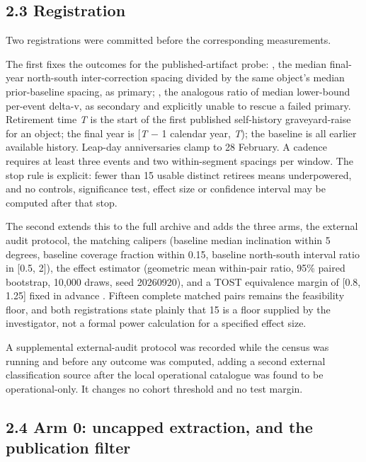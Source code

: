 \documentclass[11pt]{article}
\begin{document}
\subsection*{2.3 Registration}

Two registrations were committed before the corresponding measurements.

The first
fixes the outcomes for the published-artifact probe: , the median final-year north-south inter-correction spacing divided by the same object's median prior-baseline spacing, as primary; , the analogous ratio of median lower-bound per-event delta-v, as secondary and explicitly unable to rescue a failed primary. Retirement time \emph{T} is the start of the first published self-history graveyard-raise for an object; the final year is [\emph{T} $-$ 1 calendar year, \emph{T}); the baseline is all earlier available history. Leap-day anniversaries clamp to 28 February. A cadence requires at least three events and two within-segment spacings per window. The stop rule is explicit: fewer than 15 usable distinct retirees means underpowered, and no controls, significance test, effect size or confidence interval may be computed after that stop.

The second
extends this to the full archive and adds the three arms, the external audit protocol, the matching calipers (baseline median inclination within 5 degrees, baseline coverage fraction within 0.15, baseline north-south interval ratio in [0.5, 2]), the effect estimator (geometric mean within-pair ratio, 95\% paired bootstrap, 10,000 draws, seed 20260920), and a TOST equivalence margin of [0.8, 1.25] fixed in advance%
. Fifteen complete matched pairs remains the feasibility floor, and both registrations state plainly that 15 is a floor supplied by the investigator, not a formal power calculation for a specified effect size.

A supplemental external-audit protocol
was recorded while the census was running and before any outcome was computed, adding a second external classification source after the local operational catalogue was found to be operational-only. It changes no cohort threshold and no test margin.

\subsection*{2.4 Arm 0: uncapped extraction, and the publication filter}
\end{document}
